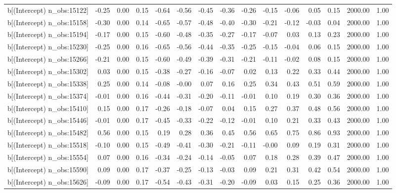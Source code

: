 \begin{table}[ht]
\begin{tabular}{rrrrrrrrrrrrrrr}
  b[(Intercept) n\_obs:15122] & -0.25 & 0.00 & 0.15 & -0.64 & -0.56 & -0.45 & -0.36 & -0.26 & -0.15 & -0.06 & 0.05 & 0.15 & 2000.00 & 1.00 \\ 
  b[(Intercept) n\_obs:15158] & -0.30 & 0.00 & 0.14 & -0.65 & -0.57 & -0.48 & -0.40 & -0.30 & -0.21 & -0.12 & -0.03 & 0.04 & 2000.00 & 1.00 \\ 
  b[(Intercept) n\_obs:15194] & -0.17 & 0.00 & 0.15 & -0.60 & -0.48 & -0.35 & -0.27 & -0.17 & -0.07 & 0.03 & 0.13 & 0.23 & 2000.00 & 1.00 \\ 
  b[(Intercept) n\_obs:15230] & -0.25 & 0.00 & 0.16 & -0.65 & -0.56 & -0.44 & -0.35 & -0.25 & -0.15 & -0.04 & 0.06 & 0.15 & 2000.00 & 1.00 \\ 
  b[(Intercept) n\_obs:15266] & -0.21 & 0.00 & 0.15 & -0.60 & -0.49 & -0.39 & -0.31 & -0.21 & -0.11 & -0.02 & 0.08 & 0.15 & 2000.00 & 1.00 \\ 
  b[(Intercept) n\_obs:15302] & 0.03 & 0.00 & 0.15 & -0.38 & -0.27 & -0.16 & -0.07 & 0.02 & 0.13 & 0.22 & 0.33 & 0.44 & 2000.00 & 1.00 \\ 
  b[(Intercept) n\_obs:15338] & 0.25 & 0.00 & 0.14 & -0.08 & -0.00 & 0.07 & 0.16 & 0.25 & 0.34 & 0.43 & 0.51 & 0.59 & 2000.00 & 1.00 \\ 
  b[(Intercept) n\_obs:15374] & -0.01 & 0.00 & 0.16 & -0.44 & -0.31 & -0.20 & -0.11 & -0.01 & 0.10 & 0.19 & 0.30 & 0.36 & 2000.00 & 1.00 \\ 
  b[(Intercept) n\_obs:15410] & 0.15 & 0.00 & 0.17 & -0.26 & -0.18 & -0.07 & 0.04 & 0.15 & 0.27 & 0.37 & 0.48 & 0.56 & 2000.00 & 1.00 \\ 
  b[(Intercept) n\_obs:15446] & -0.01 & 0.00 & 0.17 & -0.45 & -0.33 & -0.22 & -0.12 & -0.01 & 0.10 & 0.21 & 0.33 & 0.43 & 2000.00 & 1.00 \\ 
  b[(Intercept) n\_obs:15482] & 0.56 & 0.00 & 0.15 & 0.19 & 0.28 & 0.36 & 0.45 & 0.56 & 0.65 & 0.75 & 0.86 & 0.93 & 2000.00 & 1.00 \\ 
  b[(Intercept) n\_obs:15518] & -0.10 & 0.00 & 0.15 & -0.49 & -0.41 & -0.30 & -0.21 & -0.11 & -0.00 & 0.09 & 0.19 & 0.31 & 2000.00 & 1.00 \\ 
  b[(Intercept) n\_obs:15554] & 0.07 & 0.00 & 0.16 & -0.34 & -0.24 & -0.14 & -0.05 & 0.07 & 0.18 & 0.28 & 0.39 & 0.47 & 2000.00 & 1.00 \\ 
  b[(Intercept) n\_obs:15590] & 0.09 & 0.00 & 0.17 & -0.37 & -0.25 & -0.13 & -0.03 & 0.09 & 0.21 & 0.31 & 0.42 & 0.54 & 2000.00 & 1.00 \\ 
  b[(Intercept) n\_obs:15626] & -0.09 & 0.00 & 0.17 & -0.54 & -0.43 & -0.31 & -0.20 & -0.09 & 0.03 & 0.15 & 0.25 & 0.36 & 2000.00 & 1.00 \\ 

\end{tabular}
\end{table}
